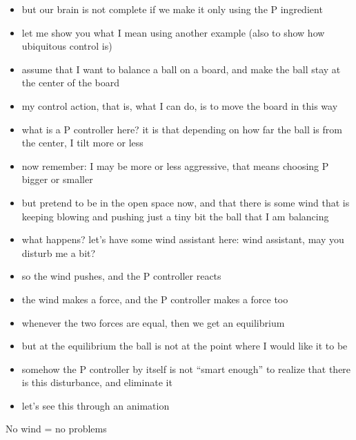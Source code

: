 \begin{frame}
	\begin{footnotesize}
	\begin{itemize}
		\item but our brain is not complete if we make it only using the P ingredient
		\item let me show you what I mean using another example (also to show how ubiquitous control is)
		\item assume that I want to balance a ball on a board, and make the ball stay at the center of the board
		\item my control action, that is, what I can do, is to move the board in this way
		\item what is a P controller here? it is that depending on how far the ball is from the center, I tilt more or less
		\item now remember: I may be more or less aggressive, that means choosing P bigger or smaller
		\item but pretend to be in the open space now, and that there is some wind that is keeping blowing and pushing just a tiny bit the ball that I am balancing
		\item what happens? let's have some wind assistant here: wind assistant, may you disturb me a bit?
		\item so the wind pushes, and the P controller reacts
		\item the wind makes a force, and the P controller makes a force too
		\item whenever the two forces are equal, then we get an equilibrium
		\item but at the equilibrium the ball is not at the point where I would like it to be
		\item somehow the P controller by itself is not ``smart enough'' to realize that there is this disturbance, and eliminate it
		\item let's see this through an animation
	\end{itemize}
	\end{footnotesize}
\end{frame}


\begin{frame}[t]{No wind = no problems}
	\begin{center}
	\end{center}
\end{frame}


